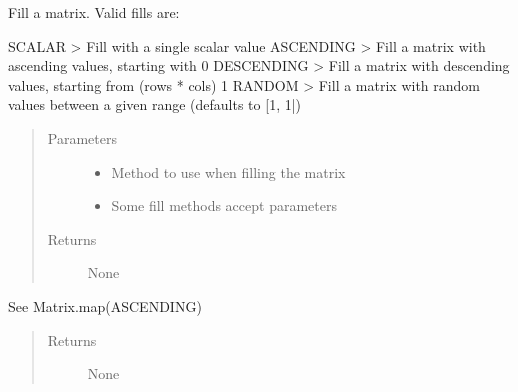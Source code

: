 \documentclass[letterpaper,10pt,english]{sphinxmanual}
\begin{document}
\begin{fulllineitems}
\begin{fulllineitems}
\begin{quote}
\begin{description}
\end{description}\end{quote}

\end{fulllineitems}


\begin{fulllineitems}
\label{\detokenize{libpymath.matrix:libpymath.matrix.matrix.Matrix.fill}}
Fill a matrix. Valid fills are:

SCALAR      \sphinxhyphen{}\textgreater{} Fill with a single scalar value
ASCENDING   \sphinxhyphen{}\textgreater{} Fill a matrix with ascending values, starting with 0
DESCENDING  \sphinxhyphen{}\textgreater{} Fill a matrix with descending values, starting from (rows * cols) \sphinxhyphen{} 1
RANDOM      \sphinxhyphen{}\textgreater{} Fill a matrix with random values between a given range (defaults to {[}\sphinxhyphen{}1, 1|)
\begin{quote}\begin{description}
\item[{Parameters}] \leavevmode\begin{itemize}
\item {} 
 \textendash{} Method to use when filling the matrix

\item {} 
 \textendash{} Some fill methods accept parameters

\end{itemize}

\item[{Returns}] \leavevmode
None

\end{description}\end{quote}

\end{fulllineitems}


\begin{fulllineitems}
\label{\detokenize{libpymath.matrix:libpymath.matrix.matrix.Matrix.fillAscending}}
See Matrix.map(ASCENDING)
\begin{quote}\begin{description}
\item[{Returns}] \leavevmode
None


\end{description}
\end{quote}
\end{fulllineitems}
\end{fulllineitems}
\end{document}
